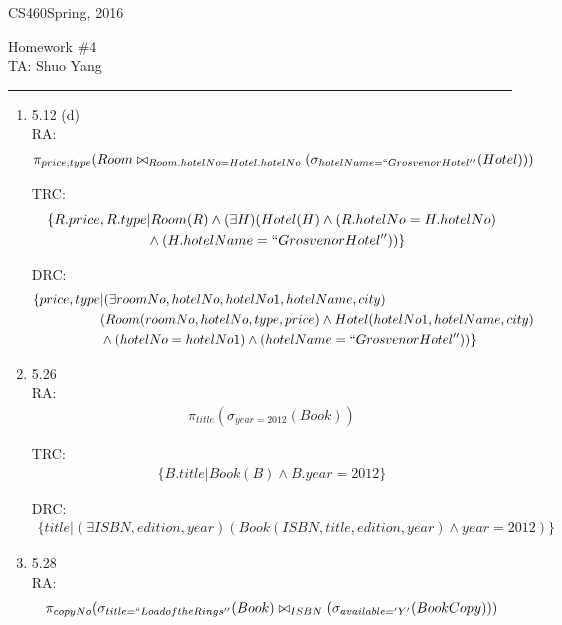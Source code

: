 \documentclass[10pt]{article}
\def\CourseCode{CS460}
\def\AssignmentNo{4}
\def\DateHandedOut{Spring, 2016}
\def\Author{Shuo Yang}
\begin{document}
\noindent

\CourseCode \hfill \DateHandedOut

\begin{center}
Homework \#\AssignmentNo\\
TA: \Author\\
\end{center}

\hrule\smallskip

\begin{enumerate}
\item 5.12 (d)\\
  RA:
  \begin{align*}
    \pi_{price, type}(Room \bowtie_{Room.hotelNo=Hotel.hotelNo}
    (\sigma_{hotelName=``Grosvenor Hotel''}(Hotel)))
  \end{align*}

  TRC:
  \begin{align*}
    \{R.price, R.type &| Room(R) \land (\exists H)(Hotel(H) \land
    (R.hotelNo=H.hotelNo)\\ &\land (H.hotelName = ``Grosvenor Hotel'')) \}
  \end{align*}

  DRC:
  \begin{align*}
    \{price, type &| (\exists
    roomNo,hotelNo,hotelNo1,hotelName,city)\\
    &(Room(roomNo, hotelNo, type, price) \land Hotel(hotelNo1,
    hotelName, city)\\
    &\land  (hotelNo = hotelNo1) \land (hotelName = ``Grosvenor Hotel''))\}
  \end{align*}

\item 5.26\\
  RA:
  \begin{align*}
    \pi_{title}(\sigma_{year=2012}(Book))
  \end{align*}

  TRC:
  \begin{align*}
    \{B.title | Book(B) \land B.year=2012\}
  \end{align*}

  DRC:
  \begin{align*}
    \{title | (\exists ISBN, edition, year) (Book(ISBN, title,
    edition, year) \land year=2012)\}
  \end{align*}
  
\item 5.28\\
  RA:
  \begin{align*}
    \pi_{copyNo}(\sigma_{title=``Load of the Rings''}(Book)
    \bowtie_{ISBN} (\sigma_{available='Y'}(BookCopy)))
  \end{align*}


\end{enumerate}
\end{document}
